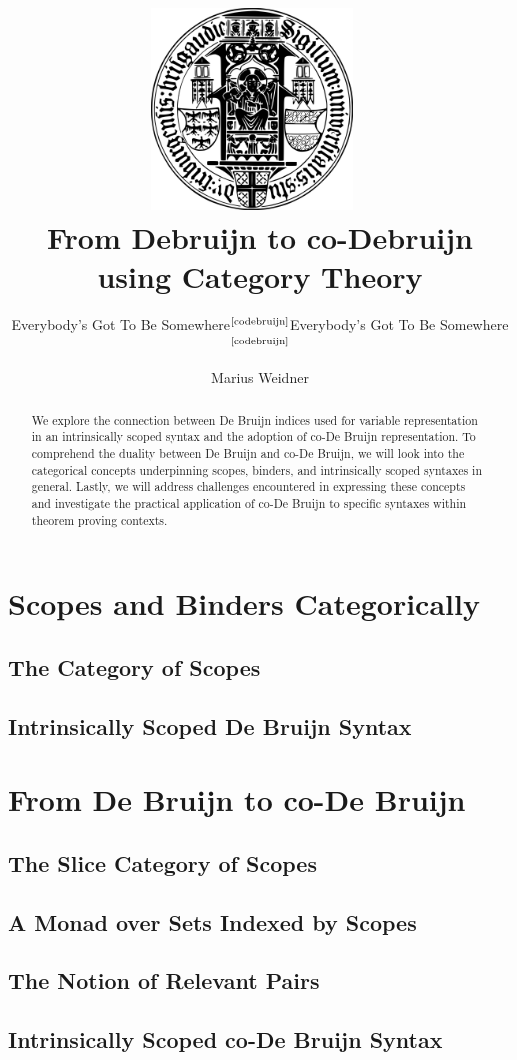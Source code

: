\documentclass[runningheads]{llncs}
\subtitle{Everybody's Got To Be Somewhere$^{\text{\cite{codebruijn}}}$}
\title{\includegraphics[width=0.4\textwidth]{seal.png}~\\[1cm] From Debruijn to co-Debruijn using Category Theory}
\subtitle{Everybody's Got To Be Somewhere$^{\text{\cite{codebruijn}}}$}
\institute{Chair of Programming Languages, University of Freiburg \\
  \email{weidner@cs.uni-freiburg.de}}
\author{Marius Weidner}
\begin{document}
\let\oldaddcontentsline\addcontentsline{}
\def\addcontentsline#1#2#3{}
\maketitle
\def\addcontentsline#1#2#3{\oldaddcontentsline{#1}{#2}{#3}}

\begin{abstract}
  We explore the connection between De Bruijn indices used for variable representation in an intrinsically scoped syntax and the adoption of co-De Bruijn representation. 
  To comprehend the duality between De Bruijn and co-De Bruijn, we will look into the categorical concepts underpinning scopes, binders, and intrinsically scoped syntaxes in general. 
  Lastly, we will address challenges encountered in expressing these concepts and investigate the practical application of co-De Bruijn to specific syntaxes within theorem proving contexts.
\end{abstract}

\setcounter{tocdepth}{2}
\tableofcontents
\newpage

\section{Scopes and Binders Categorically}
\subsection{The Category of Scopes}
\subsection{Intrinsically Scoped De Bruijn Syntax}

\section{From De Bruijn to co-De Bruijn}
\subsection{The Slice Category of Scopes}
\subsection{A Monad over Sets Indexed by Scopes}
\subsection{The Notion of Relevant Pairs}
\subsection{Intrinsically Scoped co-De Bruijn Syntax}
\end{document}
